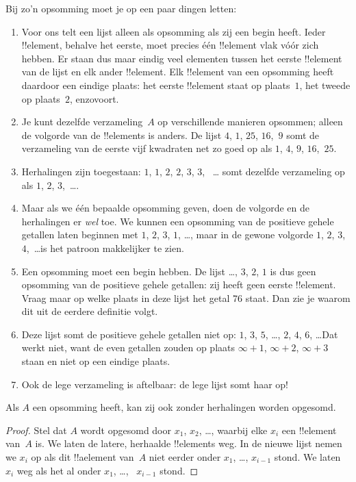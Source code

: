 \documentclass[../../../include/open-logic-section]{subfiles}
\begin{document}
\begin{explain}
Bij zo'n opsomming moet je op een paar dingen letten:
\begin{enumerate}
\item Voor ons telt een lijst alleen als opsomming als zij een begin
  heeft. Ieder !!{element}, behalve het eerste, moet precies één
  !!{element} vlak vóór zich hebben. Er staan dus maar eindig veel
  elementen tussen het eerste !!{element} van de lijst en elk ander
  !!{element}. Elk !!{element} van een opsomming heeft daardoor een
  eindige plaats: het eerste !!{element} staat op plaats~$1$, het
  tweede op plaats~$2$, enzovoort.
\item Je kunt dezelfde verzameling~$A$ op verschillende manieren
  opsommen; alleen de volgorde van de !!{element}s is anders. De lijst
  $4$, $1$, $25$, $16$,~$9$ somt de verzameling van
  de eerste vijf kwadraten net zo goed op als $1$, $4$, $9$, $16$,~$25$.
\item Herhalingen zijn toegestaan: $1$, $1$, $2$, $2$, $3$, $3$,
  ~\dots{} somt dezelfde verzameling op als $1$, $2$, $3$,~\dots{}.
\item Maar als we één bepaalde opsomming geven, doen de volgorde en de
  herhalingen er \emph{wel} toe. We kunnen een opsomming van de positieve
  gehele getallen laten beginnen met $1$, $2$, $3$, $1$, \dots{}, maar in de gewone
  volgorde $1$, $2$, $3$, $4$,~\dots is het patroon makkelijker te zien.
\item Een opsomming moet een begin hebben. De lijst \dots, $3$, $2$,
  $1$ is dus geen opsomming van de positieve gehele getallen: zij heeft
  geen eerste !!{element}. Vraag maar op welke plaats in deze lijst het
  getal 76 staat. Dan zie je waarom dit uit de eerdere definitie volgt.
\item Deze lijst somt de positieve gehele getallen niet op: $1$, $3$,
  $5$, \dots, $2$, $4$, $6$, \dots\@ Dat werkt niet, want de even
  getallen zouden op plaats $\infty + 1$, $\infty + 2$, $\infty + 3$
  staan en niet op een eindige plaats.
\item Ook de lege verzameling is aftelbaar: de lege lijst somt haar op!{}
\end{enumerate}
\end{explain}

\begin{prop}
  Als $A$ een opsomming heeft, kan zij ook zonder herhalingen worden
  opgesomd.
\end{prop}

\begin{proof}
  Stel dat $A$ wordt opgesomd door $x_1$, $x_2$, \dots{}, waarbij elke
  $x_i$ een !!{element} van~$A$ is. We laten de latere, herhaalde !!{element}s weg.
  In de nieuwe lijst nemen we $x_i$ op als dit !!a{element} van~$A$
  niet eerder onder $x_1$, \dots,
  $x_{i-1}$ stond. We laten $x_i$ weg als het al onder $x_1$, \dots,
  ~$x_{i-1}$ stond.
\end{proof}
\end{document}
